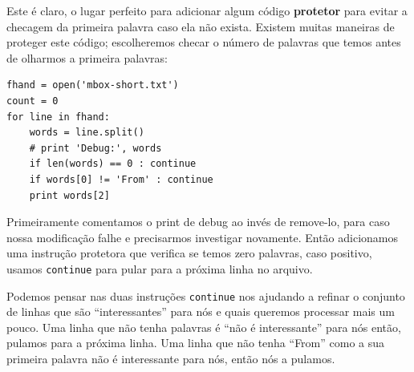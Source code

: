 \begin{enumerate}

Este é claro, o lugar perfeito para adicionar algum código {\bf protetor} para
evitar a checagem da primeira palavra caso ela não exista.
Existem muitas maneiras de proteger este código; escolheremos checar
o número de palavras que temos antes de olharmos a primeira palavras:



\beforeverb
\begin{verbatim}
fhand = open('mbox-short.txt')
count = 0
for line in fhand:
    words = line.split()
    # print 'Debug:', words
    if len(words) == 0 : continue
    if words[0] != 'From' : continue
    print words[2]
\end{verbatim}
\afterverb
%
Primeiramente comentamos o print de debug ao invés de remove-lo,
para caso nossa modificação falhe e precisarmos investigar novamente.
Então adicionamos uma instrução protetora que verifica se temos zero palavras, caso positivo,
usamos {\tt continue} para pular para a próxima linha no arquivo.


Podemos pensar nas duas instruções {\tt continue} nos ajudando a refinar
o conjunto de linhas que são ``interessantes'' para nós e quais queremos
processar mais um pouco. Uma linha que não tenha palavras é ``não é interessante''
 para nós então, pulamos para a próxima linha. Uma linha que não tenha ``From''
 como a sua primeira palavra não é interessante para nós, então nós a pulamos.



\end{enumerate}
